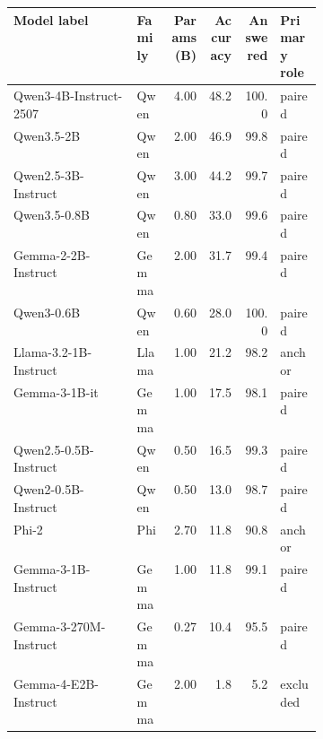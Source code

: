 \begin{tabular}{p{0.40\linewidth}lrrrl}
\toprule
Model label & Family & Params (B) & Accuracy & Answered & Primary role \\
\midrule
Qwen3-4B-Instruct-2507 & Qwen & 4.00 & 48.2 & 100.0 & paired \\
Qwen3.5-2B & Qwen & 2.00 & 46.9 & 99.8 & paired \\
Qwen2.5-3B-Instruct & Qwen & 3.00 & 44.2 & 99.7 & paired \\
Qwen3.5-0.8B & Qwen & 0.80 & 33.0 & 99.6 & paired \\
Gemma-2-2B-Instruct & Gemma & 2.00 & 31.7 & 99.4 & paired \\
Qwen3-0.6B & Qwen & 0.60 & 28.0 & 100.0 & paired \\
Llama-3.2-1B-Instruct & Llama & 1.00 & 21.2 & 98.2 & anchor \\
Gemma-3-1B-it & Gemma & 1.00 & 17.5 & 98.1 & paired \\
Qwen2.5-0.5B-Instruct & Qwen & 0.50 & 16.5 & 99.3 & paired \\
Qwen2-0.5B-Instruct & Qwen & 0.50 & 13.0 & 98.7 & paired \\
Phi-2 & Phi & 2.70 & 11.8 & 90.8 & anchor \\
Gemma-3-1B-Instruct & Gemma & 1.00 & 11.8 & 99.1 & paired \\
Gemma-3-270M-Instruct & Gemma & 0.27 & 10.4 & 95.5 & paired \\
Gemma-4-E2B-Instruct & Gemma & 2.00 & 1.8 & 5.2 & excluded \\
\bottomrule
\end{tabular}
